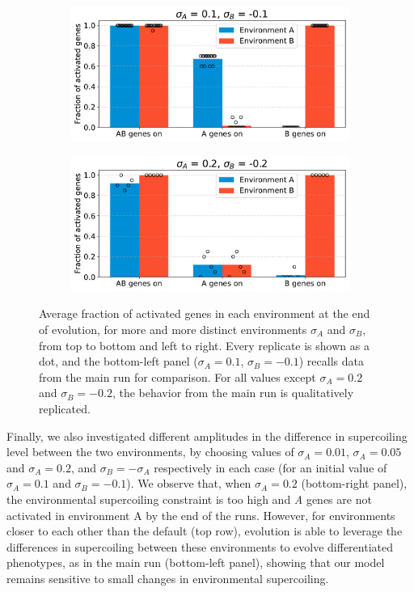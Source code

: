 \begin{figure}[H]
  \begin{subfigure}[t]{0.49\textwidth}
    \includegraphics[width=\textwidth]{alife/img/mean_activation_sigma.pdf}
    \label{subfig:alife:param_sigma_3}
  \end{subfigure}
  \begin{subfigure}[t]{0.49\textwidth}
    \includegraphics[width=\textwidth]{alife/img/mean_activation_sigma-0.2.pdf}
    \label{subfig:alife:param_sigma_4}
  \end{subfigure}
  \caption[Parameter exploration in the proof-of-concept model: varying $\sigma_A$ and $\sigma_B$]{Average fraction of activated genes in each environment at the end of evolution, for more and more distinct environments $\sigma_A$ and $\sigma_B$, from top to bottom and left to right.
  Every replicate is shown as a dot, and the bottom-left panel ($\sigma_A = 0.1$, $\sigma_B = -0.1$) recalls data from the main run for comparison.
  For all values except $\sigma_A = 0.2$ and $\sigma_B = -0.2$, the behavior from the main run is qualitatively replicated.}
  \label{fig:alife:param_sigma}
\end{figure}

Finally, we also investigated different amplitudes in the difference in supercoiling level between the two environments, by choosing values of $\sigma_A = 0.01$, $\sigma_A = 0.05$ and $\sigma_A = 0.2$, and $\sigma_B = -\sigma_A$ respectively in each case (for an initial value of $\sigma_A = 0.1$ and $\sigma_B = -0.1$).
We observe that, when $\sigma_A = 0.2$ (bottom-right panel), the environmental supercoiling constraint is too high and \emph{A} genes are not activated in environment A by the end of the runs.
However, for environments closer to each other than the default (top row), evolution is able to leverage the differences in supercoiling between these environments to evolve differentiated phenotypes, as in the main run (bottom-left panel), showing that our model remains sensitive to small changes in environmental supercoiling.

